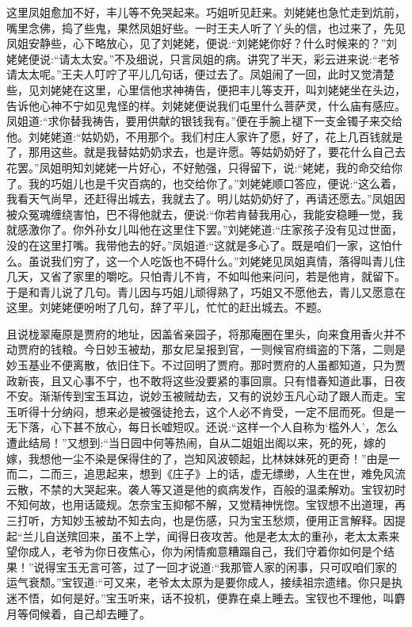 \begin{parag}
    这里凤姐愈加不好，丰儿等不免哭起来。巧姐听见赶来。刘姥姥也急忙走到炕前，嘴里念佛，捣了些鬼，果然凤姐好些。一时王夫人听了丫头的信，也过来了，先见凤姐安静些，心下略放心，见了刘姥姥，便说:“刘姥姥你好？什么时候来的？”刘姥姥便说:“请太太安。”不及细说，只言凤姐的病。讲究了半天，彩云进来说:“老爷请太太呢。”王夫人叮咛了平儿几句话，便过去了。凤姐闹了一回，此时又觉清楚些，见刘姥姥在这里，心里信他求神祷告，便把丰儿等支开，叫刘姥姥坐在头边，告诉他心神不宁如见鬼怪的样。刘姥姥便说我们屯里什么菩萨灵，什么庙有感应。凤姐道:“求你替我祷告，要用供献的银钱我有。”便在手腕上褪下一支金镯子来交给他。刘姥姥道:“姑奶奶，不用那个。我们村庄人家许了愿，好了，花上几百钱就是了，那用这些。就是我替姑奶奶求去，也是许愿。等姑奶奶好了，要花什么自己去花罢。”凤姐明知刘姥姥一片好心，不好勉强，只得留下，说:“姥姥，我的命交给你了。我的巧姐儿也是千灾百病的，也交给你了。”刘姥姥顺口答应，便说:“这么着，我看天气尚早，还赶得出城去，我就去了。明儿姑奶奶好了，再请还愿去。”凤姐因被众冤魂缠绕害怕，巴不得他就去，便说:“你若肯替我用心，我能安稳睡一觉，我就感激你了。你外孙女儿叫他在这里住下罢。”刘姥姥道:“庄家孩子没有见过世面，没的在这里打嘴。我带他去的好。”凤姐道:“这就是多心了。既是咱们一家，这怕什么。虽说我们穷了，这一个人吃饭也不碍什么。”刘姥姥见凤姐真情，落得叫青儿住几天，又省了家里的嚼吃。只怕青儿不肯，不如叫他来问问，若是他肯，就留下。于是和青儿说了几句。青儿因与巧姐儿顽得熟了，巧姐又不愿他去，青儿又愿意在这里。刘姥姥便吩咐了几句，辞了平儿，忙忙的赶出城去。不题。
\end{parag}


\begin{parag}
    且说栊翠庵原是贾府的地址，因盖省亲园子，将那庵圈在里头，向来食用香火并不动贾府的钱粮。今日妙玉被劫，那女尼呈报到官，一则候官府缉盗的下落，二则是妙玉基业不便离散，依旧住下。不过回明了贾府。那时贾府的人虽都知道，只为贾政新丧，且又心事不宁，也不敢将这些没要紧的事回禀。只有惜春知道此事，日夜不安。渐渐传到宝玉耳边，说妙玉被贼劫去，又有的说妙玉凡心动了跟人而走。宝玉听得十分纳闷，想来必是被强徒抢去，这个人必不肯受，一定不屈而死。但是一无下落，心下甚不放心，每日长嘘短叹。还说:“这样一个人自称为‘槛外人’，怎么遭此结局！”又想到:“当日园中何等热闹，自从二姐姐出阁以来，死的死，嫁的嫁，我想他一尘不染是保得住的了，岂知风波顿起，比林妹妹死的更奇！”由是一而二，二而三，追思起来，想到《庄子》上的话，虚无缥缈，人生在世，难免风流云散，不禁的大哭起来。袭人等又道是他的疯病发作，百般的温柔解劝。宝钗初时不知何故，也用话箴规。怎奈宝玉抑郁不解，又觉精神恍惚。宝钗想不出道理，再三打听，方知妙玉被劫不知去向，也是伤感，只为宝玉愁烦，便用正言解释。因提起“兰儿自送殡回来，虽不上学，闻得日夜攻苦。他是老太太的重孙，老太太素来望你成人，老爷为你日夜焦心，你为闲情痴意糟蹋自己，我们守着你如何是个结果！”说得宝玉无言可答，过了一回才说道:“我那管人家的闲事，只可叹咱们家的运气衰颓。”宝钗道:“可又来，老爷太太原为是要你成人，接续祖宗遗绪。你只是执迷不悟，如何是好。”宝玉听来，话不投机，便靠在桌上睡去。宝钗也不理他，叫麝月等伺候着，自己却去睡了。
\end{parag}


